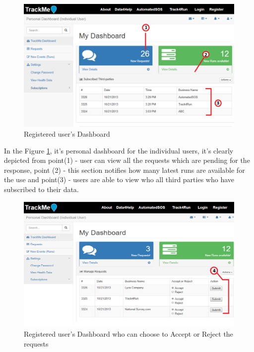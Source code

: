\documentclass[a4paper, hidelinks, 12pt]{report}
\begin{document}
	\begin{figure}[H]
		\centering
		\includegraphics[width=1\textwidth]{../Assets/Dashboard_individual.png}
		\caption[UI: Registered individual's Dashboard]{Registered user's Dashboard}
		\label{fig:Dashboard_individual}
	\end{figure}
	
	In the Figure \ref{fig:Dashboard_individual}, it's personal dashboard for the individual users, it's clearly depicted from point(1) - user can view all the requests which are pending for the response, point (2) - this section notifies how many latest runs are available for the use and point(3) - users are able to view who all third parties who have subscribed to their data.
	
	\begin{figure}[H]
		\centering
		\includegraphics[width=1\textwidth]{../Assets/Individual_Request.png}
		\caption[UI: Registered user's Dashboard who can choose to Accept or Reject the requests]{Registered user's Dashboard who can choose to Accept or Reject the requests}
		\label{fig:Individual_Request}
	\end{figure}
	
\end{document}
